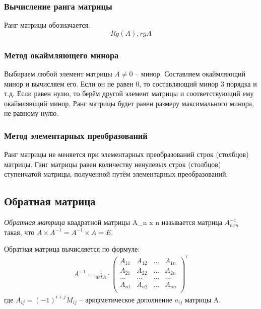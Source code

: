 \subsubsection{Вычисление ранга матрицы}

Ранг матрицы обозначается: \[
  Rg(A), rg A
\] 

\subsubsection*{Метод окаймляющего минора} 

Выбираем любой элемент матрицы $A \neq 0$ -- минор.
Составляем окаймляющий минор и вычисляем его. Если он не равен 0, то составляющий минор 3 порядка и т.д.
Если равен нулю, то берём другой элемент матрицы и соответствующий ему окаймляющий минор.
Ранг матрицы будет равен размеру максимального минора, не равному нулю.

\subsubsection*{Метод элементарных преобразований}

\begin{theorem}
  Ранг матрицы не меняется при элементарных преобразований строк (столбцов) матрицы.
  Ганг матрицы равен количеству ненулевых строк (столбцов) ступенчатой матрицы, полученной путём элементарных преобразований.
\end{theorem}

\subsection{Обратная матрица}

\begin{definition}
  \textit{Обратная матрица} квадратной матрицы A_{n x n} называется матрица $A^{-1}_{n x n}$ такая, что $A \times A^{-1} = A^{-1} \times A = E$.
\end{definition}

Обратная матрица вычисляется по формуле:
\begin{gather*}
  \boxed{
    A^{-1} = \frac{1}{det A} \cdot 
    \begin{pmatrix}
      A_{11} & A_{12} & \ldots & A_{1n} \\
      A_{21} & A_{22} & \ldots & A_{2n} \\
      \ldots & \ldots & \ldots & \ldots \\
      A_{n1} & A_{n2} & \ldots & A_{nn} \\
    \end{pmatrix} ^ \tau
  }
\end{gather*}
где $A_{ij} = (-1)^{i+j} M_{ij}$ -- арифметическое дополнение $a_{ij}$ матрицы A.

